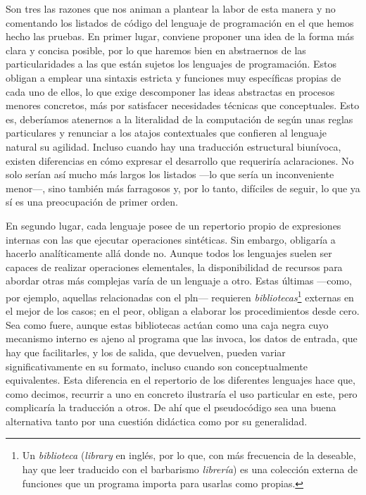 Son tres las razones que nos animan a plantear la labor de esta manera y no comentando los listados de código del lenguaje de programación en el que hemos hecho las pruebas. En primer lugar, conviene proponer una idea de la forma más clara y concisa posible, por lo que haremos bien en abstraernos de las particularidades a las que están sujetos los lenguajes de programación. Estos obligan a emplear una sintaxis estricta y funciones muy específicas propias de cada uno de ellos, lo que exige descomponer las ideas abstractas en procesos menores concretos, más por satisfacer necesidades técnicas que conceptuales. Esto es, deberíamos atenernos a la literalidad de la computación de según unas reglas particulares y renunciar a los atajos contextuales que confieren al lenguaje natural su agilidad. Incluso cuando hay una traducción estructural biunívoca, existen diferencias en cómo expresar el desarrollo que requeriría aclaraciones. No solo serían así mucho más largos los listados —lo que sería un inconveniente menor—, sino también más farragosos y, por lo tanto, difíciles de seguir, lo que ya sí es una preocupación de primer orden.

En segundo lugar, cada lenguaje posee de un repertorio propio de expresiones internas con las que ejecutar operaciones sintéticas. Sin embargo, obligaría a hacerlo analíticamente allá donde no. Aunque todos los lenguajes suelen ser capaces de realizar operaciones elementales, la disponibilidad de recursos para abordar otras más complejas varía de un lenguaje a otro. Estas últimas —como, por ejemplo, aquellas relacionadas con el \ac{pln}— requieren \textit{bibliotecas}\footnote{Un \textit{biblioteca} (\textit{library} en inglés, por lo que, con más frecuencia de la deseable, hay que leer traducido con el barbarismo \textit{librería}) es una colección externa de funciones que un programa importa para usarlas como propias.} externas en el mejor de los casos; en el peor, obligan a elaborar los procedimientos desde cero. Sea como fuere, aunque estas bibliotecas actúan como una caja negra cuyo mecanismo interno es ajeno al programa que las invoca, los datos de entrada, que hay que facilitarles, y los de salida, que devuelven, pueden variar significativamente en su formato, incluso cuando son conceptualmente equivalentes. Esta diferencia en el repertorio de los diferentes lenguajes hace que, como decimos, recurrir a uno en concreto ilustraría el uso particular en este, pero complicaría la traducción a otros. De ahí que el pseudocódigo sea una buena alternativa tanto por una cuestión didáctica como por su generalidad.

